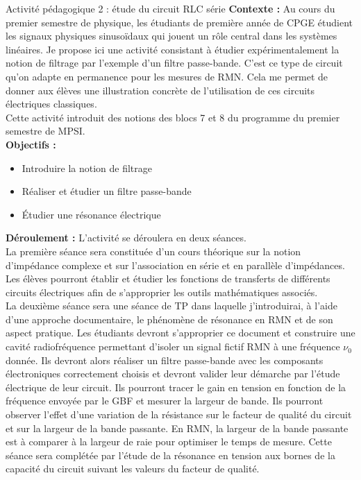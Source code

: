\begin{highlightBlock}{Activité pédagogique 2 : étude du circuit RLC série}
\textbf{Contexte : }Au cours du premier semestre de physique, les étudiants de première année de CPGE étudient les signaux physiques sinusoïdaux qui jouent un rôle central dans les systèmes linéaires. Je propose ici une activité consistant à étudier expérimentalement la notion de filtrage par l'exemple d'un filtre passe-bande. C'est ce type de circuit qu'on adapte en permanence pour les mesures de RMN. Cela me permet de donner aux élèves une illustration concrète de l'utilisation de ces circuits électriques classiques.\\
Cette activité introduit des notions des blocs 7 et 8 du programme du premier semestre de MPSI.\\
\textbf{Objectifs : }
\begin{itemize}
 \item Introduire la notion de filtrage 
 \item Réaliser et étudier un filtre passe-bande
 \item Étudier une résonance électrique
\end{itemize}   
\textbf{Déroulement : }L'activité se déroulera en deux séances.\\
La première séance sera constituée d'un cours théorique sur la notion d'impédance complexe et sur l'association en série et en parallèle d'impédances. Les élèves pourront établir et étudier les fonctions de transferts de différents circuits électriques afin de s'approprier les outils mathématiques associés.\\
La deuxième séance sera une séance de TP dans laquelle j'introduirai, à l'aide d'une approche documentaire, le phénomène de résonance en RMN et de son aspect pratique. Les étudiants devront s'approprier ce document et construire une cavité radiofréquence permettant d'isoler un signal fictif RMN à une fréquence $\nu_0$ donnée. Ils devront alors réaliser un filtre passe-bande avec les composants électroniques correctement choisis et devront valider leur démarche par l'étude électrique de leur circuit. Ils pourront tracer le gain en tension en fonction de la fréquence envoyée par le GBF et mesurer la largeur de bande. Ils pourront observer l'effet d'une variation de la résistance sur le facteur de qualité du circuit et sur la largeur de la bande passante. En RMN, la largeur de la bande passante est à comparer à la largeur de raie pour optimiser le temps de mesure. Cette séance sera complétée par l'étude de la résonance en tension aux bornes de la capacité du circuit suivant les valeurs du facteur de qualité.\\

\end{highlightBlock}
